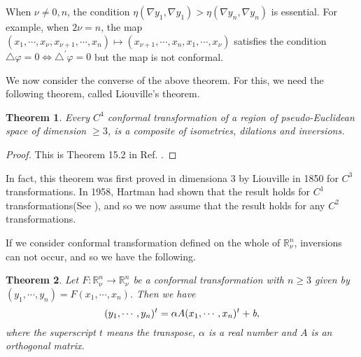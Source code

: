 \documentclass[a4paper,10pt]{amsart}
\theoremstyle{plain}
\newtheorem{thm}{Theorem}[section]
\newtheorem*{main theorem}{Theorem}
\theoremstyle{definition}
\begin{document}
When $\nu \neq 0, n$, the condition $\eta(\nabla y_1, \nabla y_1)
> \eta(\nabla y_n, \nabla y_n)$ is essential. For example, when
$2\nu=n$, the map $(x_1, \cdots, x_\nu, x_{\nu+1}, \cdots, x_n)
\mapsto (x_{\nu+1}, \cdots, x_n, x_1, \cdots, x_\nu)$ satisfies
the condition $\triangle \varphi = 0 \Leftrightarrow
\triangle^\prime \varphi = 0$ but the map is not conformal.

We now consider the converse of the above theorem. For this, we
need the following theorem, called Liouville's theorem.

\begin{thm}
Every $C^4$ conformal transformation of a region of
pseudo-Euclidean space of dimension $\geq 3$, is a composite of
isometries, dilations and inversions.
\end{thm}
\begin{proof}
This is Theorem 15.2 in Ref. \cite{DFN}.
\end{proof}

In fact, this theorem was first proved in dimensiona 3 by
Liouville in 1850 for $C^3$ transformations. In 1958, Hartman had
shown that the result holds for $C^1$ transformations(See
\cite{Hartman}), and so we now assume that the result holds for
any $C^2$ transformations.

If we consider conformal transformation defined on the whole of
$\mathbb{R}^n_\nu$, inversions can not occur, and so we have the
following.

\begin{thm}
Let $F : \mathbb{R}^n_\nu \rightarrow \mathbb{R}^n_\nu$ be a
conformal transformation with $n \geq 3$ given by $(y_1, \cdots,
y_n) = F(x_1, \cdots, x_n)$. Then we have
$$ (y_1, \cdots, y_n)^t = \alpha A (x_1, \cdots, x_n)^t +
\emph{b},$$ where the superscript $t$ means the transpose,
$\alpha$ is a real number and $A$ is an orthogonal matrix.
\end{thm}
\end{document}
